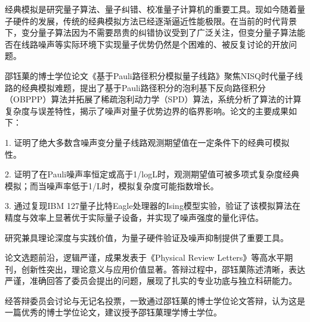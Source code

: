 
\begin{resolution}
  经典模拟是研究量子算法、量子纠错、校准量子计算机的重要工具。现如今随着量子硬件的发展，传统的经典模拟方法已经逐渐逼近性能极限。在当前的时代背景下，变分量子算法因为不需要昂贵的纠错协议受到了广泛关注，但变分量子算法能否在线路噪声等实际环境下实现量子优势仍然是个困难的、被反复讨论的开放问题。

邵钰菓的博士学位论文《基于Pauli路径积分模拟量子线路》聚焦NISQ时代量子线路的经典模拟难题，提出了基于Pauli路径积分的泡利基下反向路径积分（OBPPP）算法并拓展了稀疏泡利动力学（SPD）算法，系统分析了算法的计算复杂度与误差特性，揭示了噪声对量子优势边界的临界影响。论文的主要成果如下：


1. 证明了绝大多数含噪声变分量子线路观测期望值在一定条件下的经典可模拟性。

2. 证明了在Pauli噪声率恒定或高于1/logL时，观测期望值可被多项式复杂度经典模拟；而当噪声率低于1/L时，模拟复杂度可能指数增长。

3. 通过复现IBM 127量子比特Eagle处理器的Ising模型实验，验证了该模拟算法在精度与效率上显著优于实际量子设备，并实现了噪声强度的量化评估。

研究兼具理论深度与实践价值，为量子硬件验证及噪声抑制提供了重要工具。


论文选题前沿，逻辑严谨，成果发表于《Physical Review Letters》等高水平期刊，创新性突出，理论意义与应用价值显著。答辩过程中，邵钰菓陈述清晰，表达严谨，准确回答了委员会提出的问题，展现了扎实的专业功底与独立科研能力。


经答辩委员会讨论与无记名投票，一致通过邵钰菓的博士学位论文答辩，认为这是一篇优秀的博士学位论文，建议授予邵钰菓理学博士学位。


\end{resolution}
